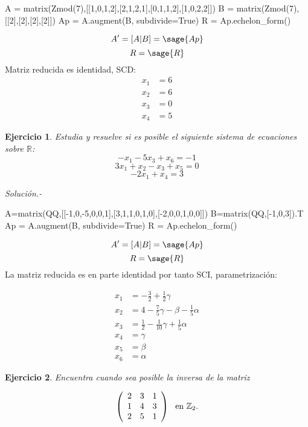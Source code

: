 \documentclass{amsart}
\newtheorem{ejer}{Ejercicio}
\def\r{\mathbb{R}}
\def\z{\mathbb{Z}}
\begin{document}
\begin{sageblock}
A = matrix(Zmod(7),[[1,0,1,2],[2,1,2,1],[0,1,1,2],[1,0,2,2]])
B = matrix(Zmod(7),[[2],[2],[2],[2]])
Ap = A.augment(B, subdivide=True)
R = Ap.echelon_form()
\end{sageblock}

$$
A' = [A|B] = \sage{Ap}
$$
$$
R = \sage{R}
$$
Matriz reducida es identidad, SCD:
\begin{align*}
	x_1 &= 6 \\
	x_2 &= 6 \\
	x_3 &= 0 \\
	x_4 &= 5
\end{align*}


\begin{ejer} Estudia y resuelve si es posible el siguiente sistema de ecuaciones sobre $\r $:
\[ -x_{1} - 5x_{3} + x_{6} = -1 \]
\[ 3x_{1} + x_{2} - x_{3} + x_{5} = 0 \]
\[ -2x_{1} + x_{4} = 3 \]

\end{ejer}

{\it Soluci\'on.- }

\begin{sageblock}
A=matrix(QQ,[[-1,0,-5,0,0,1],[3,1,1,0,1,0],[-2,0,0,1,0,0]])
B=matrix(QQ,[-1,0,3]).T
Ap = A.augment(B, subdivide=True)
R = Ap.echelon_form()
\end{sageblock}

$$
A' = [A|B] = \sage{Ap}
$$
$$
R = \sage{R}
$$
La matriz reducida es en parte identidad por tanto SCI, parametrización:

\begin{align*}
	x_1 &= -\frac{3}{2} + \frac{1}{2} \gamma \\
	x_2 &= 4 - \frac{7}{5} \gamma - \beta - \frac{1}{5} \alpha \\
	x_3 &= \frac{1}{2} - \frac{1}{10} \gamma + \frac{1}{5} \alpha \\
	x_4 &= \gamma \\
	x_5 &= \beta \\
	x_6 &= \alpha
\end{align*}




\begin{ejer} Encuentra cuando sea posible la inversa de la matriz

\[ \left( \begin{array}{ccc}
2 & 3 & 1 \\
1 & 4 & 3 \\
2 & 5 & 1 \end{array} \right) \ \hbox{ en} \  \z _{2}. \] 

\end{ejer}
\end{document}

